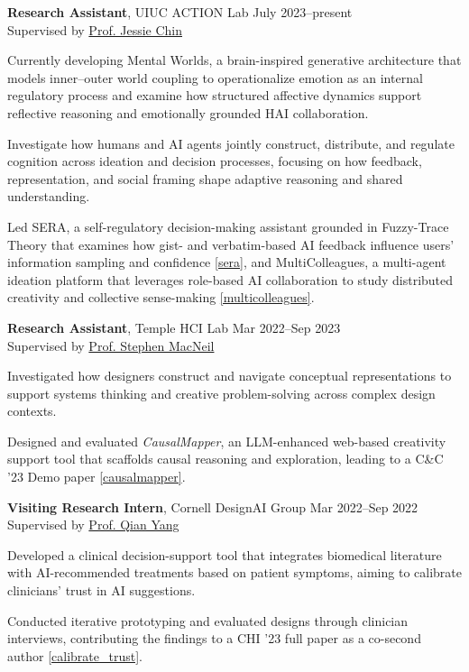 \documentclass[a4paper,11pt]{article}
\begin{document}
\textbf{Research Assistant},
{UIUC ACTION Lab}
\hfill {July 2023--present}\\
Supervised by \href{https://jessiechinlab.ischool.illinois.edu/}{Prof. Jessie Chin}
\begin{innerlist}
\item Currently developing Mental Worlds, a brain-inspired generative architecture that models inner–outer world coupling to operationalize emotion as an internal regulatory process and examine how structured affective dynamics support reflective reasoning and emotionally grounded HAI collaboration.

\item Investigate how humans and AI agents jointly construct, distribute, and regulate cognition across ideation and decision processes, focusing on how feedback, representation, and social framing shape adaptive reasoning and shared understanding.

\item Led SERA, a self-regulatory decision-making assistant grounded in Fuzzy-Trace Theory that examines how gist- and verbatim-based AI feedback influence users’ information sampling and confidence \ref{sera}, and MultiColleagues, a multi-agent ideation platform that leverages role-based AI collaboration to study distributed creativity and collective sense-making \ref{multicolleagues}.

\end{innerlist}
\vspace{0.2cm}

\textbf{Research Assistant},
{Temple HCI Lab}
\hfill {Mar 2022--Sep 2023}\\
Supervised by \href{http://stevemacn.github.io/}{Prof. Stephen MacNeil}
\begin{innerlist}
\item Investigated how designers construct and navigate conceptual representations to support systems thinking and creative problem-solving across complex design contexts.
\item Designed and evaluated \textit{CausalMapper}, an LLM-enhanced web-based creativity support tool that scaffolds causal reasoning and exploration, leading to a C\&C ’23 Demo paper \ref{causalmapper}.

\end{innerlist}
\vspace{0.2cm}

\textbf{Visiting Research Intern},
{Cornell DesignAI Group}
\hfill {Mar 2022--Sep 2022}\\
Supervised by \href{https://qianyang.co/}{Prof. Qian Yang}
\begin{innerlist}
\item Developed a clinical decision-support tool that integrates biomedical literature with AI-recommended treatments based on patient symptoms, aiming to calibrate clinicians’ trust in AI suggestions.
\item Conducted iterative prototyping and evaluated designs through clinician interviews, contributing the findings to a CHI '23 full paper as a co-second author \ref{calibrate_trust}.
\end{innerlist}
\end{document}
